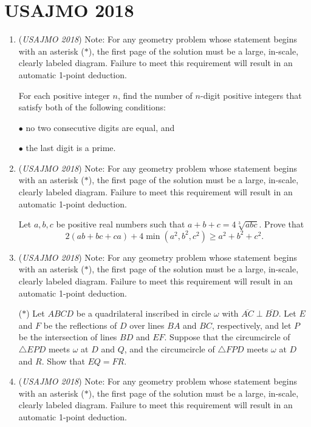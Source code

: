 \section{USAJMO 2018}
        \begin{enumerate}
        	\item (\textit{USAJMO 2018}) Note: For any geometry problem whose statement begins with an asterisk ($*$), the first page of the solution must be a large, in-scale, clearly labeled diagram. Failure to meet this requirement will result in an automatic 1-point deduction. 


 For each positive integer $n$, find the number of $n$-digit positive integers that satisfy both of the following conditions:


 $\bullet$ no two consecutive digits are equal, and


 $\bullet$ the last digit is a prime.


 

	\item (\textit{USAJMO 2018}) Note: For any geometry problem whose statement begins with an asterisk ($*$), the first page of the solution must be a large, in-scale, clearly labeled diagram. Failure to meet this requirement will result in an automatic 1-point deduction. 


 Let $a,b,c$ be positive real numbers such that $a+b+c=4\sqrt[3]{abc}$. Prove that 
 \[2(ab+bc+ca)+4\min(a^2,b^2,c^2)\ge a^2+b^2+c^2.\]


	\item (\textit{USAJMO 2018}) Note: For any geometry problem whose statement begins with an asterisk ($*$), the first page of the solution must be a large, in-scale, clearly labeled diagram. Failure to meet this requirement will result in an automatic 1-point deduction. 


 ($*$) Let $ABCD$ be a quadrilateral inscribed in circle $\omega$ with $\overline{AC} \perp \overline{BD}$. Let $E$ and $F$ be the reflections of $D$ over lines $BA$ and $BC$, respectively, and let $P$ be the intersection of lines $BD$ and $EF$. Suppose that the circumcircle of $\triangle EPD$ meets $\omega$ at $D$ and $Q$, and the circumcircle of $\triangle FPD$ meets $\omega$ at $D$ and $R$. Show that $EQ = FR$.


 

	\item (\textit{USAJMO 2018}) Note: For any geometry problem whose statement begins with an asterisk ($*$), the first page of the solution must be a large, in-scale, clearly labeled diagram. Failure to meet this requirement will result in an automatic 1-point deduction. 



\end{enumerate}

